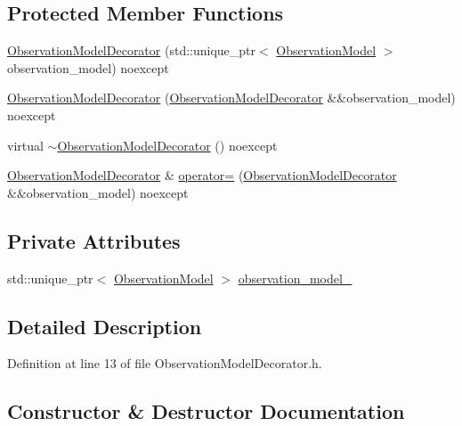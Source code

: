 \subsection*{Protected Member Functions}
\begin{DoxyCompactItemize}
\item 
\mbox{\hyperlink{classbfl_1_1ObservationModelDecorator_ac48b0ef08d89cfddb689e0ecef2cb0f9}{Observation\+Model\+Decorator}} (std\+::unique\+\_\+ptr$<$ \mbox{\hyperlink{classbfl_1_1ObservationModel}{Observation\+Model}} $>$ observation\+\_\+model) noexcept
\item 
\mbox{\hyperlink{classbfl_1_1ObservationModelDecorator_a7ab0e6fdcd159a52886559e22ac475ba}{Observation\+Model\+Decorator}} (\mbox{\hyperlink{classbfl_1_1ObservationModelDecorator}{Observation\+Model\+Decorator}} \&\&observation\+\_\+model) noexcept
\item 
virtual \mbox{\hyperlink{classbfl_1_1ObservationModelDecorator_a3bad5ad9085e34b71557d9444c6280f4}{$\sim$\+Observation\+Model\+Decorator}} () noexcept
\item 
\mbox{\hyperlink{classbfl_1_1ObservationModelDecorator}{Observation\+Model\+Decorator}} \& \mbox{\hyperlink{classbfl_1_1ObservationModelDecorator_ade8f68b2598a40e9db26fcdbc0aa6638}{operator=}} (\mbox{\hyperlink{classbfl_1_1ObservationModelDecorator}{Observation\+Model\+Decorator}} \&\&observation\+\_\+model) noexcept
\end{DoxyCompactItemize}
\subsection*{Private Attributes}
\begin{DoxyCompactItemize}
\item 
std\+::unique\+\_\+ptr$<$ \mbox{\hyperlink{classbfl_1_1ObservationModel}{Observation\+Model}} $>$ \mbox{\hyperlink{classbfl_1_1ObservationModelDecorator_abec4efacd0bb8e55bb9a6aade1bb28ad}{observation\+\_\+model\+\_\+}}
\end{DoxyCompactItemize}


\subsection{Detailed Description}


Definition at line 13 of file Observation\+Model\+Decorator.\+h.



\subsection{Constructor \& Destructor Documentation}
\mbox{\label{classbfl_1_1ObservationModelDecorator_ac48b0ef08d89cfddb689e0ecef2cb0f9}} 
